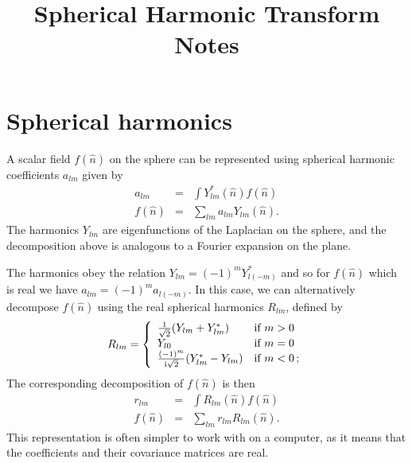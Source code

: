 \documentclass[prd,amsmath,amssymb,floatfix,nofootinbib,superscriptaddress, twocolumn]{revtex4}
\newcommand{\ylm}[2]{Y_{#1 #2}}
\newcommand{\rlm}[2]{R_{#1 #2}}
\def\pos{\hat{n}}
\def\ba{\begin{eqnarray}}
\def\ea{\end{eqnarray}}
\begin{document}
\title{Spherical Harmonic Transform Notes}

\begin{abstract}
\end{abstract}
\maketitle

\section{Spherical harmonics}
\label{sec:app:spht:ylm}
%
A scalar field $f(\pos)$ on the sphere can be represented 
using spherical harmonic coefficients $a_{lm}$ given by
\ba
a_{lm} &=& \int \ylm{l}{m}^*(\pos) f(\pos) \label{eqn:alm} \\
f(\pos) &=& \sum_{lm} a_{lm} \ylm{l}{m}(\pos) \label{eqn:fofn}.
\ea 
The harmonics $\ylm{l}{m}$ are eigenfunctions of the
Laplacian on the sphere, and the decomposition above
is analogous to a Fourier expansion on the plane.

The harmonics obey the relation 
$\ylm{l}{m} = (-1)^m \ylm{l}{(-m)}^*$
and so for $f(\pos)$ which is real
we have $a_{lm} = (-1)^m a_{l(-m)}$.
In this case, we can alternatively
decompose $f(\pos)$ using the real
spherical harmonics $R_{lm}$, defined by 
\begin{eqnarray} \label{E:realcomplex}
     R_{lm} = \left\{\begin{array}{ll}
     \frac{1}{\sqrt{2}}(\ylm{l}{m}+\ylm{l}{m}^*)&\mbox{if $m>0$} \\
     Y_{l0}&\mbox{if $m=0$} \\
     \frac{(-1)^m}{{\rm i}\sqrt{2}}(\ylm{l}{m}^*-\ylm{l}{m})&\mbox{if $m<0$}\,;
     \end{array} \right.
\end{eqnarray}
The corresponding decomposition of $f(\pos)$ is then
\ba
r_{lm} &=& \int \rlm{l}{m}(\pos) f(\pos) \label{eqn:rlm} \\
f(\pos) &=& \sum_{lm} r_{lm} \rlm{l}{m}(\pos).
\label{eqn:forfn}
\ea
This representation is often simpler to work with on a computer,
as it means that the coefficients and their covariance matrices are real.
\end{document}
